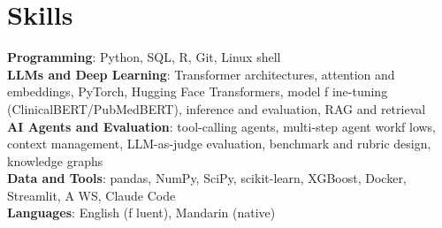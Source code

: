 \documentclass[letterpaper,11pt]{article}
\begin{document}
\section{\textbf{Skills}}
 \begin{itemize}[leftmargin=0.15in, label={}]
    \small{\item{
     \textbf{Programming}{: Python, SQL, R, Git, Linux shell} \\
     \textbf{LLMs and Deep Learning}{: Transformer architectures, attention and embeddings, PyTorch, Hugging Face Transformers, model f\kern0pt ine-tuning (ClinicalBERT/PubMedBERT), inference and evaluation, RAG and retrieval} \\
     \textbf{AI Agents and Evaluation}{: tool-calling agents, multi-step agent workf\kern0pt lows, context management, LLM-as-judge evaluation, benchmark and rubric design, knowledge graphs} \\
     \textbf{Data and Tools}{: pandas, NumPy, SciPy, scikit-learn, XGBoost, Docker, Streamlit, A\kern0pt WS, Claude Code} \\
     \textbf{Languages}{: English (f\kern0pt luent), Mandarin (native)}}}

 \end{itemize}
\end{document}
